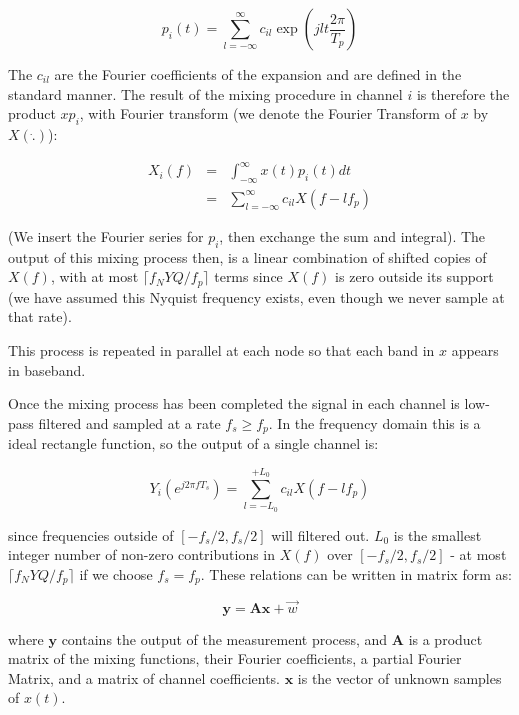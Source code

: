 \documentclass{article}
\begin{document}
\begin{equation}
p_i\left(t\right) = \sum_{l=-\infty}^{\infty} c_{il} \exp\left({jlt\frac{2\pi}{T_p}}\right)
\end{equation}

The \(c_{il}\) are the Fourier coefficients of the expansion and are defined in the standard manner. The result of the mixing procedure in channel \(i\) is therefore the product \(xp_i\), with Fourier transform (we denote the Fourier Transform of \(x\) by \(X\left( \dot{.} \right)\)):

\begin{align}
X_{i}\left(f\right) &=& \int_{-\infty}^{\infty} x\left(t\right) p_i\left(t\right) dt \nonumber
\\ &=& \sum_{l=-\infty}^{\infty} c_{il} X\left(f-lf_p\right)
\end{align}

(We insert the Fourier series for \(p_i\), then exchange the sum and integral). The output of this mixing process then, is a linear combination of shifted copies of \(X\left(f\right)\), with at most \(\lceil f_NYQ/f_p\rceil\) terms since \(X\left(f\right)\) is zero outside its support (we have assumed this Nyquist frequency exists, even though we never sample at that rate).

This process is repeated in parallel at each node so that each band in \(x\) appears in baseband.

Once the mixing process has been completed the signal in each channel is low-pass filtered and sampled at a rate \(f_s \geq f_p\). In the frequency domain this is a ideal rectangle function, so the output of a single channel is:

\begin{equation}
Y_i\left(e^{j 2 \pi f T_s }\right) = \sum_{l = -L_0}^{+L_0} c_{il} X\left(f-lf_p\right)
\end{equation}

since frequencies outside of \([-f_s/2, f_s/2]\) will filtered out. \(L_0\) is the smallest integer number of non-zero contributions in \(X\left(f\right)\) over \([-f_s/2, f_s/2]\) - at most \(\lceil f_NYQ/f_p\rceil\) if we choose \(f_s = f_p\). These relations can be written in matrix form as:

\begin{equation}
\textbf{y} = \textbf{A}\textbf{x} + \vec{w}
\label{system}
\end{equation}

where \(\textbf{y}\) contains the output of the measurement process, and \(\textbf{A}\) is a product matrix of the mixing functions, their Fourier coefficients, a partial Fourier Matrix, and a matrix of channel coefficients. \(\textbf{x}\) is the vector of unknown samples of \(x\left(t\right)\). 
\end{document}
